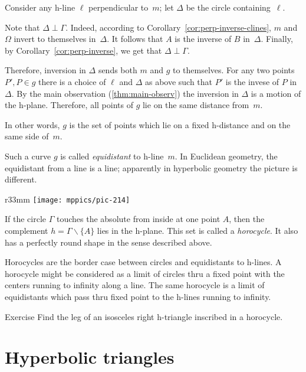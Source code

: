 Consider any h-line $\ell$ perpendicular to~$m$;
let $\Delta$ be the circle containing~$\ell$.

Note that $\Delta\perp \Gamma$.
Indeed,
according to Corollary~\ref{cor:perp-inverse-clines}, $m$ and $\Omega$ invert to themselves in~$\Delta$.
It follows that $A$ is the inverse of $B$ in~$\Delta$.
Finally, by Corollary~\ref{cor:perp-inverse}, we get that $\Delta\perp \Gamma$.

Therefore, inversion in $\Delta$ sends both $m$ and $g$ to themselves.
For any two points $P',P\in g$ there is a choice of $\ell$ and $\Delta$ as above such that
$P'$ is the invese of $P$ in $\Delta$.
By the main observation (\ref{thm:main-observ}) the inversion in $\Delta$ is a motion of the h-plane. Therefore, all points of $g$ lie on the same distance from~$m$.

In other words, $g$ is the set of points which lie on a fixed h-distance and on the same side of~$m$.


Such a curve $g$ is called 
\emph{equidistant} to h-line~$m$.
In Euclidean geometry, the equidistant from a line is a line;
apparently in hyperbolic geometry the picture is different.

{

\begin{wrapfigure}{r}{33mm}
\vskip-0mm
\centering
\texttt{[image: mppics/pic-214]}
\end{wrapfigure}

If the circle $\Gamma$ touches the absolute from inside at one point $A$, then the complement $h=\Gamma\backslash\{A\}$ lies in the h-plane.
This set is called a \emph{horocycle}.
It also has a perfectly round shape in the sense described above.


Horocycles are the border case between circles and equidistants to h-lines.
A horocycle might be considered as a limit of circles 
thru a fixed point
with the centers running to infinity along a line.
The same horocycle is a limit of equidistants which pass thru fixed point to the h-lines running to infinity.

\begin{thm}{Exercise}\label{ex:right-trig-horocycle}
Find the leg of an isosceles right h-triangle inscribed in a horocycle.
\end{thm}


}

\section*{Hyperbolic triangles}


